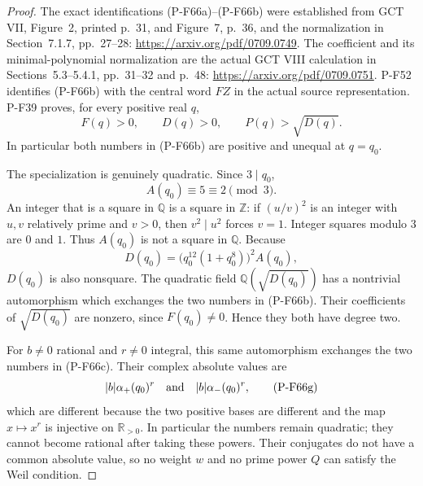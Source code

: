 \begin{proof}
The exact identifications (P-F66a)--(P-F66b) were established
from GCT VII, Figure~2, printed p.~31, and Figure~7, p.~36,
and the normalization in Section~7.1.7, pp.~27--28:
\url{https://arxiv.org/pdf/0709.0749}.
The coefficient and its minimal-polynomial normalization are
the actual GCT VIII calculation in Sections~5.3--5.4.1,
pp.~31--32 and p.~48:
\url{https://arxiv.org/pdf/0709.0751}.
P-F52 identifies (P-F66b) with the central word $FZ$ in
the actual source representation.  P-F39 proves, for every
positive real $q$,
\[
                 F(q)>0,\qquad D(q)>0,\qquad
                         P(q)>\sqrt{D(q)}.
                                                        \tag{P-F66e}
\]
In particular both numbers in (P-F66b) are positive and
unequal at $q=q_0$.

The specialization is genuinely quadratic.  Since $3\mid q_0$,
\[
                         A(q_0)\equiv5\equiv2\pmod3.
                                                        \tag{P-F66f}
\]
An integer that is a square in $\mathbb Q$ is a square
in $\mathbb Z$: if $(u/v)^2$ is an integer with
$u,v$ relatively prime and $v>0$, then $v^2\mid u^2$
forces $v=1$.  Integer squares modulo $3$ are $0$ and $1$.
Thus $A(q_0)$ is not a square in $\mathbb Q$.
Because
\[
                 D(q_0)=\bigl(q_0^{12}(1+q_0^8)\bigr)^2A(q_0),
\]
$D(q_0)$ is also nonsquare.  The quadratic field
$\mathbb Q(\sqrt{D(q_0)})$ has a nontrivial automorphism
which exchanges the two numbers in (P-F66b).  Their
coefficients of $\sqrt{D(q_0)}$ are nonzero, since
$F(q_0)\ne0$.  Hence they both have degree two.

For $b\ne0$ rational and $r\ne0$ integral, this same
automorphism exchanges the two numbers in (P-F66c).
Their complex absolute values are
\[
                 |b|\alpha_+(q_0)^r
                 \quad\hbox{and}\quad
                 |b|\alpha_-(q_0)^r,
                                                        \tag{P-F66g}
\]
which are different because the two positive bases are
different and the map $x\mapsto x^r$ is injective on
$\mathbb R_{>0}$.  In particular the numbers remain
quadratic; they cannot become rational after taking
these powers.  Their conjugates do not have a common
absolute value, so no weight $w$ and no prime power $Q$
can satisfy the Weil condition.


\end{proof}
